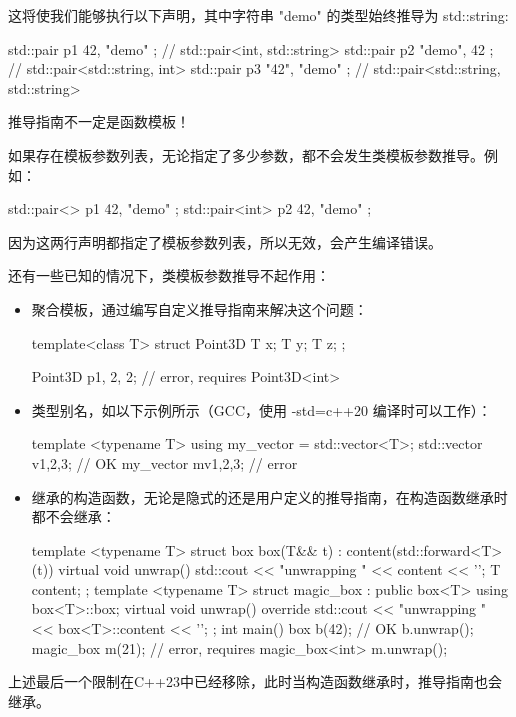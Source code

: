 这将使我们能够执行以下声明，其中字符串 "demo" 的类型始终推导为 std::string:

\begin{cpp}
std::pair  p1{ 42, "demo" };    // std::pair<int, std::string>
std::pair  p2{ "demo", 42 };    // std::pair<std::string, int>
std::pair  p3{ "42", "demo" };  // std::pair<std::string, std::string>
\end{cpp}

\begin{myNotic}{}
推导指南不一定是函数模板！
\end{myNotic}

如果存在模板参数列表，无论指定了多少参数，都不会发生类模板参数推导。例如：

\begin{cpp}
std::pair<>    p1 { 42, "demo" };
std::pair<int> p2 { 42, "demo" };
\end{cpp}

因为这两行声明都指定了模板参数列表，所以无效，会产生编译错误。

还有一些已知的情况下，类模板参数推导不起作用：

\begin{itemize}
\item
聚合模板，通过编写自定义推导指南来解决这个问题：

\begin{cpp}
template<class T>
struct Point3D { T x; T y; T z; };

Point3D p{1, 2, 2};   // error, requires Point3D<int>
\end{cpp}

\item
类型别名，如以下示例所示（GCC，使用 -std=c++20 编译时可以工作）：

\begin{cpp}
template <typename T>
using my_vector = std::vector<T>;
std::vector v{1,2,3}; // OK
my_vector mv{1,2,3};  // error
\end{cpp}

\item
继承的构造函数，无论是隐式的还是用户定义的推导指南，在构造函数继承时都不会继承：

\begin{cpp}
template <typename T>
struct box
{
    box(T&& t) : content(std::forward<T>(t)) {}
    virtual void unwrap()
    { std::cout << "unwrapping " << content << '\n'; }
    T content;
};
template <typename T>
struct magic_box : public box<T>
{
    using box<T>::box;
    virtual void unwrap() override
    { std::cout << "unwrapping " << box<T>::content << '\n'; }
};
int main()
{
    box b(42);        // OK
    b.unwrap();
    magic_box m(21);  // error, requires magic_box<int>
    m.unwrap();
}
\end{cpp}

\end{itemize}

上述最后一个限制在C++23中已经移除，此时当构造函数继承时，推导指南也会继承。















